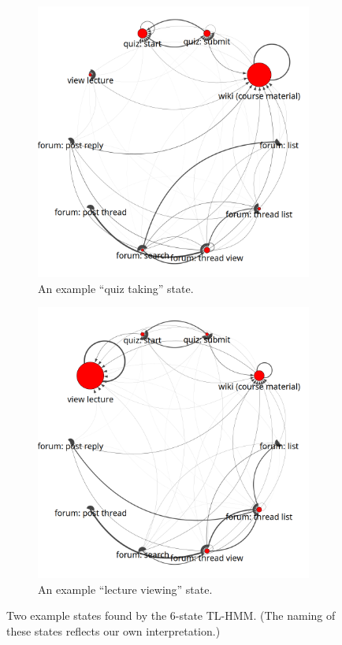 \begin{figure}
  \centering
  \begin{subfigure}[t]{0.5\textwidth}
    \includegraphics[width=\textwidth]{figures/text-6state/state0.png}
    \caption{An example ``quiz taking'' state.}
    \label{fig:practice-quiz-state}
  \end{subfigure}%
  \begin{subfigure}[t]{0.5\textwidth}
    \includegraphics[width=\textwidth]{figures/text-6state/state1.png}
    \caption{An example ``lecture viewing'' state.}
    \label{fig:lecture-viewing-state}
  \end{subfigure}
  \caption{Two example states found by the 6-state TL-HMM. (The naming of
  these states reflects our own interpretation.)}
  \label{fig:states}
\end{figure}

